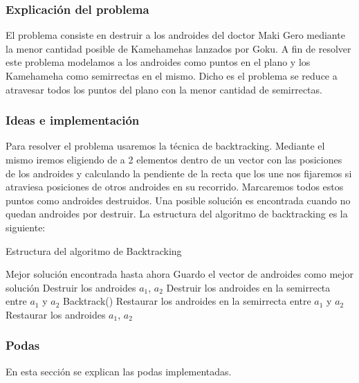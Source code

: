 \subsubsection{Explicación del problema}
El problema consiste en destruir a los androides del doctor Maki Gero mediante la menor cantidad posible de Kamehamehas lanzados por Goku.
A fin de resolver este problema modelamos a los androides como puntos en el plano y los Kamehameha como semirrectas en el mismo. Dicho es el problema se reduce a atravesar todos los puntos del plano con la menor cantidad de semirrectas.

\subsubsection{Ideas e implementación}
Para resolver el problema usaremos la técnica de backtracking. Mediante el mismo iremos eligiendo de a 2 elementos dentro de un vector con las posiciones de los androides y calculando la pendiente de la recta que los une nos fijaremos si atraviesa posiciones de otros androides en su recorrido. Marcaremos todos estos puntos como androides destruidos.
Una posible solución es encontrada cuando no quedan androides por destruir.
La estructura del algoritmo de backtracking es la siguiente:

\begin{algorithm}[h!]
\caption{Estructura del algoritmo de Backtracking}
\begin{algorithmic}[1]
		\State Mejor solución encontrada hasta ahora
		\State Guardo el vector de androides como mejor solución
	\Else
                    \State Destruir los androides $a_1$, $a_2$
                    \State Destruir los androides en la semirrecta entre $a_1$ y $a_2$
                    \State Backtrack()
                    \State Restaurar los androides en la semirrecta entre $a_1$ y $a_2$
                    \State Restaurar los androides $a_1$, $a_2$                        
                \EndIf
            \EndIf
		\EndFor
	\EndIf
	\EndFunction
\end{algorithmic}
\end{algorithm}

\subsubsection{Podas}
En esta sección se explican las podas implementadas.

